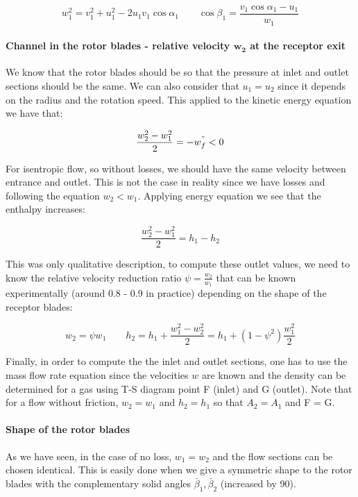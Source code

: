 \begin{equation}
w_1 ^2 = v_1^2+u_1^2 - 2u_1v_1\cos \alpha _1\qquad \cos \beta _1 = \frac{v_1\cos \alpha _1 - u_1}{w_1}
\end{equation}

\paragraph{Channel in the rotor blades - relative velocity $\bm{w_2}$ at the receptor exit}

We know that the rotor blades should be so that the pressure at inlet and outlet sections should be the same. We can also consider that $u_1 = u_2$ since it depends on the radius and the rotation speed. This applied to the kinetic energy equation we have that: 

\begin{equation}
\frac{w_2^2 - w_1^2}{2} = -w^"_f < 0
\end{equation}

For isentropic flow, so without losses, we should have the same velocity between entrance and outlet. This is not the case in reality since we have losses and following the equation $w_2 < w_1$. Applying energy equation we see that the enthalpy increases: 

\begin{equation}
\frac{w_2^2 - w_1^2}{2} = h_1 - h_2
\end{equation}

This was only qualitative description, to compute these outlet values, we need to know the relative velocity reduction ratio $\psi = \frac{w_2}{w_1}$ that can be known experimentally (around 0.8 - 0.9 in practice) depending on the shape of the receptor blades:

\begin{equation}
w_2 = \psi w_1 \qquad h_2 = h_1 + \frac{w_1^2 - w_2 ^2}{2} = h_1 + (1- \psi ^2) \frac{w^2_1}{2}
\end{equation}

Finally, in order to compute the the inlet and outlet sections, one has to use the mass flow rate equation since the velocities $w$ are known and the density can be determined for a gas using T-S diagram point F (inlet) and G (outlet). Note that for a flow without friction, $w_2  = w_1$ and $h_2 = h_1$ so that $A_2 = A_1$ and F = G. 

\paragraph{Shape of the rotor blades}
As we have seen, in the case of no loss, $w_1 = w_2$ and the flow sections can be chosen identical. This is easily done when we give a symmetric shape to the rotor blades with the complementary solid angles $\bar{\beta}_1, \bar{\beta}_2$ (increased by 90\degres). \\

